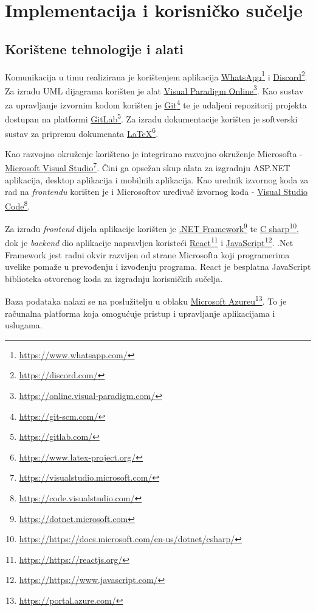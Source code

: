 


\chapter{Implementacija i korisničko sučelje}
		
		
		\section{Korištene tehnologije i alati}
			 
			 \par
			 Komunikacija u timu realizirana je korištenjem aplikacija \underline{WhatsApp}\footnote{\url{https://www.whatsapp.com/}} i \underline{Discord}\footnote{\url{https://discord.com/}}. Za izradu UML dijagrama korišten je alat \underline{Visual Paradigm Online}\footnote{\url{https://online.visual-paradigm.com/}}. Kao sustav za upravljanje izvornim kodom korišten je \underline{Git}\footnote{\url{https://git-scm.com/}} te je udaljeni repozitorij projekta dostupan na platformi \underline{GitLab}\footnote{\url{https://gitlab.com/}}. Za izradu dokumentacije korišten je softverski sustav za pripremu dokumenata \underline{LaTeX}\footnote{\url{https://www.latex-project.org/}}.
			 \par
			 Kao razvojno okruženje korišteno je integrirano razvojno okruženje Microsofta - \underline{Microsoft Visual Studio}\footnote{\url{https://visualstudio.microsoft.com/}}. Čini ga opsežan skup alata za izgradnju ASP.NET aplikacija, desktop aplikacija i mobilnih aplikacija. Kao urednik izvornog koda za rad na \textit{frontendu} korišten je i Microsoftov uređivač izvornog koda - \underline{Visual Studio Code}\footnote{\url{https://code.visualstudio.com/}}.
			 \par
			 Za izradu \textit{frontend} dijela aplikacije korišten je \underline{.NET Framework}\footnote{\url{https://dotnet.microsoft.com}} te \underline{C sharp}\footnote{\url{https://https://docs.microsoft.com/en-us/dotnet/csharp/}}, dok je \textit{backend} dio aplikacije napravljen koristeći \underline{React}\footnote{\url{https://https://reactjs.org/}} i \underline{JavaScript}\footnote{\url{https://https://www.javascript.com/}}. .Net Framework jest radni okvir razvijen od strane Microsofta koji programerima uvelike pomaže u prevođenju i izvođenju programa. React je besplatna JavaScript biblioteka otvorenog koda za izgradnju korisničkih sučelja.
			 \par
			 Baza podataka nalazi se na poslužitelju u oblaku \underline{Microsoft Azureu}\footnote{\url{https://portal.azure.com/}}. To je računalna platforma koja omogućuje pristup i upravljanje aplikacijama i uslugama. 
			
